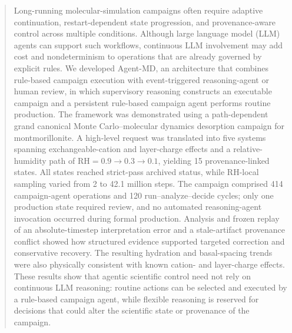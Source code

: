 \begin{abstract}
Long-running molecular-simulation campaigns often require adaptive continuation, restart-dependent state progression, and provenance-aware control across multiple conditions. Although large language model (LLM) agents can support such workflows, continuous LLM involvement may add cost and nondeterminism to operations that are already governed by explicit rules. We developed Agent-MD, an architecture that combines rule-based campaign execution with event-triggered reasoning-agent or human review, in which supervisory reasoning constructs an executable campaign and a persistent rule-based campaign agent performs routine production. The framework was demonstrated using a path-dependent grand canonical Monte Carlo--molecular dynamics desorption campaign for montmorillonite. A high-level request was translated into five systems spanning exchangeable-cation and layer-charge effects and a relative-humidity path of $\mathrm{RH} = 0.9 \rightarrow 0.3 \rightarrow 0.1$, yielding 15 provenance-linked states. All states reached strict-pass archived status, while RH-local sampling varied from 2 to 42.1 million steps. The campaign comprised 414 campaign-agent operations and 120 run--analyze--decide cycles; only one production state required review, and no automated reasoning-agent invocation occurred during formal production. Analysis and frozen replay of an absolute-timestep interpretation error and a stale-artifact provenance conflict showed how structured evidence supported targeted correction and conservative recovery. The resulting hydration and basal-spacing trends were also physically consistent with known cation- and layer-charge effects. These results show that agentic scientific control need not rely on continuous LLM reasoning: routine actions can be selected and executed by a rule-based campaign agent, while flexible reasoning is reserved for decisions that could alter the scientific state or provenance of the campaign.
\end{abstract}
